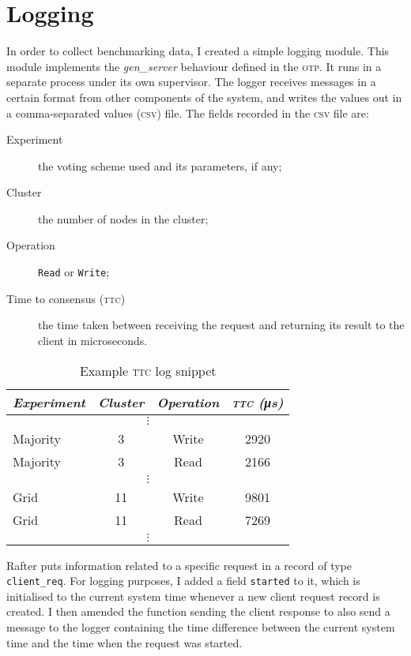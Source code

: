 \documentclass[12pt,chapterprefix=true,toc=bibliography,numbers=noendperiod,
               footnotes=multiple,twoside]{scrreprt}
\begin{document}
\section{Logging}

In order to collect benchmarking data, I created a simple logging module. This module implements the \emph{gen\_server} behaviour defined in the \textsc{otp}. It runs in a separate process under its own supervisor. The logger receives messages in a certain format from other components of the system, and writes the values out in a comma-separated values (\textsc{csv}) file. The fields recorded in the \textsc{csv} file are:

\begin{description}
    \item[Experiment] the voting scheme used and its parameters, if any;
    \item[Cluster] the number of nodes in the cluster;
    \item[Operation] \texttt{Read} or \texttt{Write};
    \item[Time to consensus (\textsc{ttc})] the time taken between receiving the request and returning its result to the client in microseconds.
\end{description}

\begin{table}[h]
    \centering
    \begin{tabular}{l c c c}
        \toprule
        \textit{Experiment} & \textit{Cluster} & \textit{Operation} & \textit{\textsc{ttc} (\si{\micro\second})} \\
        \midrule
        \multicolumn{4}{c}{\(\vdots\)} \\
        Majority & 3 & Write & 2920 \\
        Majority & 3 & Read & 2166 \\
        \multicolumn{4}{c}{\(\vdots\)} \\
        Grid & 11 & Write & 9801 \\
        Grid & 11 & Read & 7269 \\
        \multicolumn{4}{c}{\(\vdots\)} \\
        \bottomrule
    \end{tabular}
    \caption[Example TTC log snippet]{Example \textsc{ttc} log snippet}
    \label{tab:csv}
\end{table}

Rafter puts information related to a specific request in a record of type \texttt{client\_req}. For logging purposes, I added a field \texttt{started} to it, which is initialised to the current system time whenever a new client request record is created. I then amended the function sending the client response to also send a message to the logger containing the time difference between the current system time and the time when the request was started.
\end{document}
